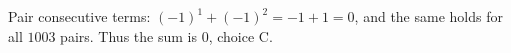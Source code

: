Pair consecutive terms: $(-1)^1+(-1)^2=-1+1=0$, and the same holds for all $1003$ pairs. Thus the sum is $\boxed0$, choice C.
